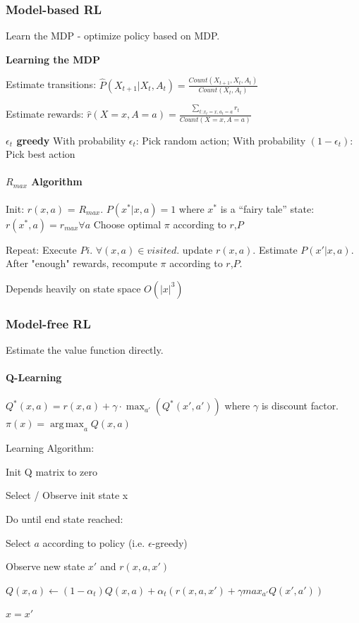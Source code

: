 \documentclass[a4paper, 10pt]{scrartcl}
\DeclareMathOperator*{\argmax}{arg\,max}
\begin{document}
\begin{multicols*}{3}
\subsubsection{Model-based RL }
Learn the MDP - optimize policy based on MDP.

\textbf{Learning the MDP}

Estimate transitions: $\hat{P}(X_{t+1} | X_t, A_t) = \frac{Count(X_{t+1}, X_t, A_t)}{Count(X_t, A_t)}$

Estimate rewards: $\hat{r}(X=x, A= a) = \frac{\sum_{t: x_t = x, a_t = a} r_t}{Count(X = x, A = a)}$

\textbf{ $\epsilon_t$ greedy}
With probability  $\epsilon_t$: Pick random action; With probability $(1- \epsilon_t)$: Pick best action

\paragraph{$R_{max}$ Algorithm}
Init: $r(x, a)$ = $R_{max}$.
$P(x^* | x, a) = 1$ where $x^*$ is a “fairy tale” state: $r(x^*, a) = r_{max}  \forall a$
Choose optimal $\pi$ according to $r$,$P$

Repeat:
Execute $Pi$. $\forall(x,a)\in visited$. update $r(x,a)$. Estimate $P(x'|x,a)$.
After "enough" rewards, recompute $\pi$ according to $r$,$P$.

Depends heavily on state space $O(|x|^3)$


\subsubsection{Model-free RL}
Estimate the value function directly.

\paragraph{Q-Learning}
$Q^*(x, a) = r(x, a) + \gamma \cdot \max_{a'} (Q^*(x', a'))$ where $\gamma$ is discount factor. $\pi(x) = \argmax_a Q(x, a )$

Learning Algorithm:
\begin{compactitem}
	\item Init Q matrix to zero
	\item Select / Observe init state x
	\item Do until end state reached:
	\item Select $a$ according to policy (i.e. $\epsilon$-greedy)
	\item Observe new state $x'$ and $r(x,a,x')$
	\item $Q(x, a) \leftarrow (1-\alpha_t)Q(x, a)  + \alpha_t(r(x,a,x') + \gamma max_{a'}Q(x',a'))$
	\item $x = x'$
\end{compactitem}


\end{multicols*}
\end{document}
